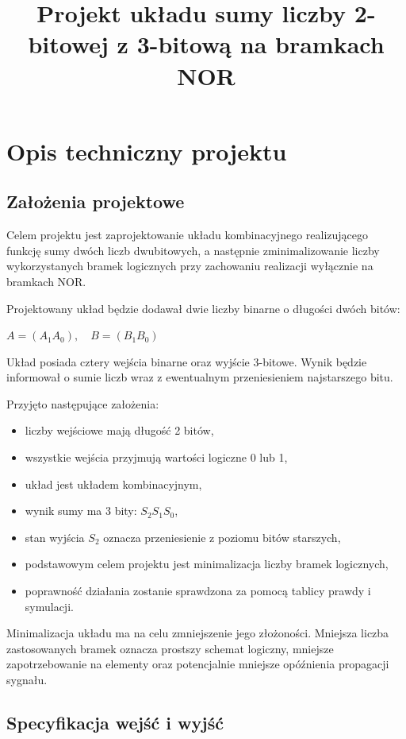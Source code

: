 \documentclass[11pt]{article}
\title{Projekt układu sumy liczby 2-bitowej z 3-bitową na bramkach NOR}
\author{}
\date{}
\begin{document}
\maketitle

\section{Opis techniczny projektu}

\subsection{Założenia projektowe}

Celem projektu jest zaprojektowanie układu kombinacyjnego realizującego funkcję sumy dwóch liczb dwubitowych, a następnie zminimalizowanie liczby wykorzystanych bramek logicznych przy zachowaniu realizacji wyłącznie na bramkach NOR.

Projektowany układ będzie dodawał dwie liczby binarne o długości dwóch bitów:
\begin{center}
$A = (A_1 A_0),\quad B = (B_1 B_0)$
\end{center}
Układ posiada cztery wejścia binarne oraz wyjście 3-bitowe. Wynik będzie informował o sumie liczb wraz z ewentualnym przeniesieniem najstarszego bitu.

Przyjęto następujące założenia:
\begin{itemize}
    \item liczby wejściowe mają długość 2 bitów,
    \item wszystkie wejścia przyjmują wartości logiczne 0 lub 1,
    \item układ jest układem kombinacyjnym,
    \item wynik sumy ma 3 bity: \(S_2 S_1 S_0\),
    \item stan wyjścia \(S_2\) oznacza przeniesienie z poziomu bitów starszych,
    \item podstawowym celem projektu jest minimalizacja liczby bramek logicznych,
    \item poprawność działania zostanie sprawdzona za pomocą tablicy prawdy i symulacji.
\end{itemize}

Minimalizacja układu ma na celu zmniejszenie jego złożoności. Mniejsza liczba zastosowanych bramek oznacza prostszy schemat logiczny, mniejsze zapotrzebowanie na elementy oraz potencjalnie mniejsze opóźnienia propagacji sygnału.

\subsection{Specyfikacja wejść i wyjść}
\end{document}
